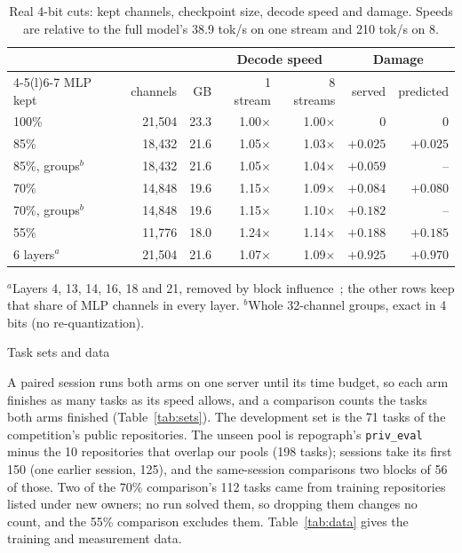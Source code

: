 \documentclass[10pt,twocolumn]{article}
\makeatletter
\newcommand{\code}[1]{\texttt{\small #1}}
\newcommand{\X}{\ensuremath{\times}}
\renewcommand\section{\@startsection{section}{1}{\z@}{-2.2ex \@plus -.6ex \@minus -.2ex}{1.1ex \@plus .2ex}%
  {\normalfont\large\bfseries}}
\makeatother
\begin{document}
\begin{table}[!ht]
  \centering
  \caption{Real 4-bit cuts: kept channels, checkpoint size, decode speed and damage. Speeds are relative to the full
  model's 38.9 tok/s on one stream and 210 tok/s on 8.}
  \label{tab:cuts}
  \footnotesize
  \setlength{\tabcolsep}{2.4pt}
  \begin{tabular*}{\columnwidth}{@{\extracolsep{\fill}}lrrrrrr@{}}
    \toprule
    & & & \multicolumn{2}{c}{Decode speed} & \multicolumn{2}{c}{Damage} \\
    \cmidrule(lr){4-5}\cmidrule(l){6-7}
    MLP kept & channels & GB & 1 stream & 8 streams & served & predicted \\
    \midrule
    100\% & 21,504 & 23.3 & 1.00\X & 1.00\X & 0 & 0 \\
    85\% & 18,432 & 21.6 & 1.05\X & 1.03\X & $+0.025$ & $+0.025$ \\
    85\%, groups$^{b}$ & 18,432 & 21.6 & 1.05\X & 1.04\X & $+0.059$ & -- \\
    70\% & 14,848 & 19.6 & 1.15\X & 1.09\X & $+0.084$ & $+0.080$ \\
    70\%, groups$^{b}$ & 14,848 & 19.6 & 1.15\X & 1.10\X & $+0.182$ & -- \\
    55\% & 11,776 & 18.0 & 1.24\X & 1.14\X & $+0.188$ & $+0.185$ \\
    6 layers$^{a}$ & 21,504 & 21.6 & 1.07\X & 1.09\X & $+0.925$ & $+0.970$ \\
    \bottomrule
  \end{tabular*}
  \par\smallskip
  {\footnotesize\raggedright $^{a}$Layers 4, 13, 14, 16, 18 and 21, removed by block influence~\citep{men2024shortgpt};
  the other rows keep that share of MLP channels in every layer. $^{b}$Whole 32-channel groups, exact in 4 bits (no
  re-quantization).\par}
\end{table}

\section{Task sets and data}\label{app:sets}

A paired session runs both arms on one server until its time budget, so each arm finishes as many tasks as its speed
allows, and a comparison counts the tasks both arms finished (Table~\ref{tab:sets}). The development set is the 71
tasks of the competition's public repositories. The unseen pool is repograph's \code{priv\_eval} minus the 10
repositories that overlap our pools (198 tasks); sessions take its first 150 (one earlier session, 125), and the
same-session comparisons two blocks of 56 of those. Two of the 70\% comparison's 112 tasks came from training
repositories listed under new owners; no run solved them, so dropping them changes no count, and the 55\% comparison
excludes them. Table~\ref{tab:data} gives the training and measurement
data.
\end{document}
